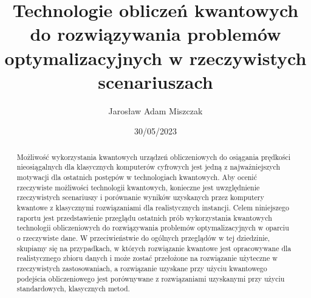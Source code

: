 \documentclass[a4paper,11pt]{article}
\begin{document}

\title{Technologie obliczeń kwantowych do rozwiązywania problemów optymalizacyjnych w rzeczywistych scenariuszach}
\author{Jaros\l aw Adam Miszczak}
\date{30/05/2023}

\maketitle

\begin{abstract}
Możliwość wykorzystania kwantowych urządzeń obliczeniowych do osiągania prędkości nieosiągalnych dla klasycznych komputerów cyfrowych jest jedną z najważniejszych motywacji dla ostatnich postępów w technologiach kwantowych. Aby ocenić rzeczywiste możliwości technologii kwantowych, konieczne jest uwzględnienie rzeczywistych scenariuszy i porównanie wyników uzyskanych przez komputery kwantowe z klasycznymi rozwiązaniami dla realistycznych instancji. Celem niniejszego raportu jest przedstawienie przeglądu ostatnich prób wykorzystania kwantowych technologii obliczeniowych do rozwiązywania problemów optymalizacyjnych w oparciu o rzeczywiste dane. W przeciwieństwie do ogólnych przeglądów w tej dziedzinie, skupiamy się na przypadkach, w których rozwiązanie kwantowe jest opracowywane dla realistycznego zbioru danych i może zostać przełożone na rozwiązanie użyteczne w rzeczywistych zastosowaniach, a rozwiązanie uzyskane przy użyciu kwantowego podejścia obliczeniowego jest porównywane z rozwiązaniami uzyskanymi przy użyciu standardowych, klasycznych metod.
\end{abstract}

\tableofcontents

%

\newpage

\end{document}
